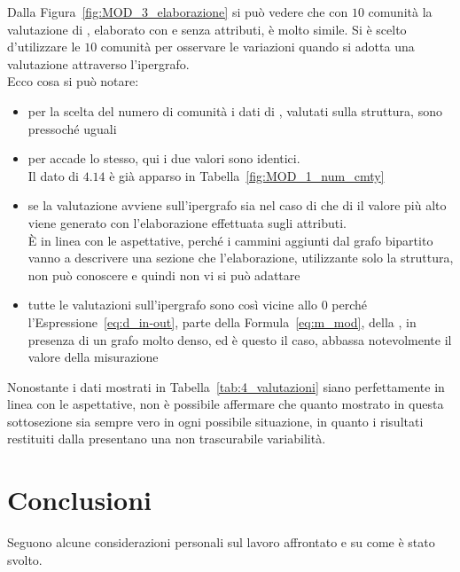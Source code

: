 %
Dalla Figura~\ref{fig:MOD_3_elaborazione} si può vedere che con $10$ comunità la valutazione di \cora, elaborato con e senza attributi, è molto simile. Si è scelto d'utilizzare le $10$ comunità per osservare le variazioni quando si adotta una valutazione attraverso l'ipergrafo.\\
Ecco cosa si può notare:
\begin{itemize}
	\item per la scelta del numero di comunità i dati di \cora, valutati sulla struttura, sono pressoché uguali
	\item per \citeseer accade lo stesso, qui i due valori sono identici.\\
	Il dato di $4.14$  è già apparso in Tabella~\ref{fig:MOD_1_num_cmty}
	\item se la valutazione avviene sull'ipergrafo sia nel caso di \cora che di \citeseer il valore più alto viene generato con l'elaborazione effettuata sugli attributi.\\
	È in linea con le aspettative, perché i cammini aggiunti dal grafo bipartito vanno a descrivere una sezione che l'elaborazione, utilizzante solo la struttura, non può conoscere e quindi non vi si può adattare
	\item tutte le valutazioni sull'ipergrafo sono così vicine allo $0$ perché l'Espressione~\ref{eq:d_in-out}, parte della Formula~\ref{eq:m_mod}, della \mmod, in presenza di un grafo molto denso, ed è questo il caso, abbassa notevolmente il valore della misurazione
\end{itemize}
%
Nonostante i dati mostrati in Tabella~\ref{tab:4_valutazioni} siano perfettamente in linea con le aspettative, non è possibile affermare che quanto mostrato in questa sottosezione sia sempre vero in ogni possibile situazione, in quanto i risultati restituiti dalla \mmod presentano una non trascurabile variabilità.



\chapter{Conclusioni}
Seguono alcune considerazioni personali sul lavoro affrontato e su come è stato svolto.
